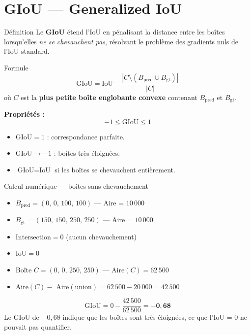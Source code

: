 \documentclass[12pt, a4paper]{report}
\newcommand{\IoU}{\text{IoU}}
\begin{document}
\section{GIoU — Generalized IoU}

\begin{definitionbox}{Définition}
  Le \textbf{GIoU} étend l'IoU en pénalisant la distance entre les boîtes
  lorsqu'elles \emph{ne se chevauchent pas}, résolvant le problème des gradients
  nuls de l'IoU standard.
\end{definitionbox}

\begin{formulebox}{Formule}
  \[
    \text{GIoU} = \IoU - \frac{|C \setminus (B_{\text{pred}} \cup B_{\text{gt}})|}{|C|}
  \]
  où $C$ est la \textbf{plus petite boîte englobante convexe} contenant
  $B_{\text{pred}}$ et $B_{\text{gt}}$.
\end{formulebox}

\textbf{Propriétés :}
\[
  -1 \leq \text{GIoU} \leq 1
\]
\begin{itemize}
  \item $\text{GIoU} = 1$ : correspondance parfaite.
  \item $\text{GIoU} \to -1$ : boîtes très éloignées.
  \item $\text{GIoU} = \IoU$ si les boîtes se chevauchent entièrement.
\end{itemize}

\begin{examplebox}{Calcul numérique — boîtes sans chevauchement}
  \begin{itemize}
    \item $B_{\text{pred}} = (0,\,0,\,100,\,100)$ — Aire = $10\,000$
    \item $B_{\text{gt}} = (150,\,150,\,250,\,250)$ — Aire = $10\,000$
    \item $\text{Intersection} = 0$ (aucun chevauchement)
    \item $\IoU = 0$
    \item Boîte $C = (0,\,0,\,250,\,250)$ — Aire$(C) = 62\,500$
    \item Aire$(C) -$ Aire$(\text{union}) = 62\,500 - 20\,000 = 42\,500$
  \end{itemize}
  \[
    \text{GIoU} = 0 - \frac{42\,500}{62\,500} = -\mathbf{0{,}68}
  \]
  Le GIoU de $-0{,}68$ indique que les boîtes sont très éloignées, ce que
  l'IoU = 0 ne pouvait pas quantifier.
\end{examplebox}
\end{document}
